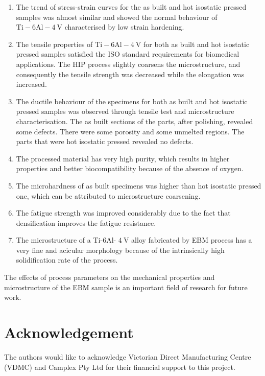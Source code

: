 \documentclass[10pt]{article}
\begin{document}
\begin{enumerate}
  \item The trend of stress-strain curves for the as built and hot isostatic pressed samples was almost similar and showed the normal behaviour of $\mathrm{Ti}-6 \mathrm{Al}-4 \mathrm{~V}$ characterised by low strain hardening.

  \item The tensile properties of $\mathrm{Ti}-6 \mathrm{Al}-4 \mathrm{~V}$ for both as built and hot isostatic pressed samples satisfied the ISO standard requirements for biomedical applications. The HIP process slightly coarsens the microstructure, and consequently the tensile strength was decreased while the elongation was increased.

  \item The ductile behaviour of the specimens for both as built and hot isostatic pressed samples was observed through tensile test and microstructure characterisation. The as built sections of the parts, after polishing, revealed some defects. There were some porosity and some unmelted regions. The parts that were hot isostatic pressed revealed no defects.

  \item The processed material has very high purity, which results in higher properties and better biocompatibility because of the absence of oxygen.

  \item The microhardness of as built specimens was higher than hot isostatic pressed one, which can be attributed to microstructure coarsening.

  \item The fatigue strength was improved considerably due to the fact that densification improves the fatigue resistance.

  \item The microstructure of a Ti-6Al- $4 \mathrm{~V}$ alloy fabricated by EBM process has a very fine and acicular morphology because of the intrinsically high solidification rate of the process.

\end{enumerate}

The effects of process parameters on the mechanical properties and microstructure of the EBM sample is an important field of research for future work.

\section*{Acknowledgement}
The authors would like to acknowledge Victorian Direct Manufacturing Centre (VDMC) and Camplex Pty Ltd for their financial support to this project.
\end{document}
